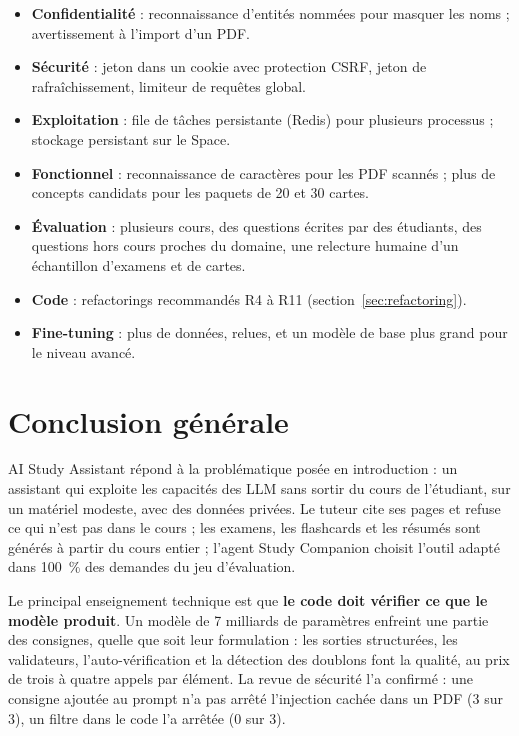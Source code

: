 \documentclass[12pt,a4paper]{report}
\DeclareRobustCommand{\code}[1]{\texttt{\codecasse{#1}}}
\begin{document}
\begin{itemize}
  \item \textbf{Confidentialité} : reconnaissance d'entités nommées pour masquer les noms ; avertissement à
        l'import d'un PDF.
  \item \textbf{Sécurité} : jeton dans un cookie \code{HttpOnly} avec protection CSRF, jeton de
        rafraîchissement, limiteur de requêtes global.
  \item \textbf{Exploitation} : file de tâches persistante (Redis) pour plusieurs processus ; stockage
        persistant sur le Space.
  \item \textbf{Fonctionnel} : reconnaissance de caractères pour les PDF scannés ; plus de concepts candidats
        pour les paquets de 20 et 30 cartes.
  \item \textbf{Évaluation} : plusieurs cours, des questions écrites par des étudiants, des questions hors
        cours proches du domaine, une relecture humaine d'un échantillon d'examens et de cartes.
  \item \textbf{Code} : refactorings recommandés R4 à R11 (section~\ref{sec:refactoring}).
  \item \textbf{Fine-tuning} : plus de données, relues, et un modèle de base plus grand pour le niveau
        avancé.
\end{itemize}

\chapter{Conclusion générale}
\label{chap:conclusion}

AI Study Assistant répond à la problématique posée en introduction : un assistant qui exploite les
capacités des LLM sans sortir du cours de l'étudiant, sur un matériel modeste, avec des données privées.
Le tuteur cite ses pages et refuse ce qui n'est pas dans le cours ; les examens, les flashcards et les
résumés sont générés à partir du cours entier ; l'agent Study Companion choisit l'outil adapté dans
100~\% des demandes du jeu d'évaluation.

Le principal enseignement technique est que \textbf{le code doit vérifier ce que le modèle produit}. Un
modèle de 7 milliards de paramètres enfreint une partie des consignes, quelle que soit leur formulation :
les sorties structurées, les validateurs, l'auto-vérification et la détection des doublons
font la qualité, au prix de trois à quatre appels par élément. La revue de sécurité l'a confirmé : une
consigne ajoutée au prompt n'a pas arrêté l'injection cachée dans un PDF (3 sur 3), un filtre dans le code
l'a arrêtée (0 sur 3).
\end{document}
